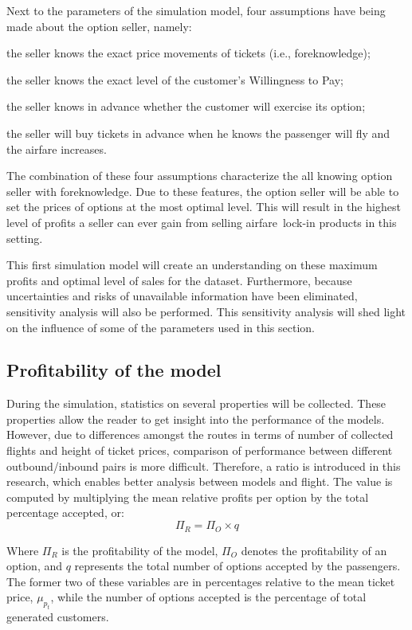 Next to the parameters of the simulation model, four assumptions have being made about the option seller, namely:
\begin{compactenum}
\item the seller knows the exact price movements of tickets (i.e., foreknowledge);
\item the seller knows the exact level of the customer's Willingness to Pay;
\item the seller knows in advance whether the customer will exercise its option;
\item the seller will buy tickets in advance when he knows the passenger will fly and the airfare increases.
\end{compactenum}

\vspace{1em}

The combination of these four assumptions characterize the all knowing option seller with foreknowledge. Due to these features, the option seller will be able to set the prices of options at the most optimal level. This will result in the highest level of profits a seller can ever gain from selling airfare~lock-in products in this setting.

This first simulation model will create an understanding on these maximum profits and optimal level of sales for the dataset. Furthermore, because uncertainties and risks of unavailable information have been eliminated, sensitivity analysis will also be performed. This sensitivity analysis will shed light on the influence of some of the parameters used in this section.


\subsection{Profitability of the model}
\label{subsec:ProfitabilityOfModel}
During the simulation, statistics on several properties will be collected. These properties allow the reader to get insight into the performance of the models. However, due to differences amongst the routes in terms of number of collected flights and height of ticket prices, comparison of performance between different outbound/inbound pairs is more difficult. Therefore, a ratio is introduced in this research, which enables better analysis between models and flight. The value is computed by multiplying the mean relative profits per option by the total percentage accepted, or:
$$\Pi_R = \Pi_O \times q$$

Where $\Pi_R$ is the profitability of the model, $\Pi_O$ denotes the profitability of an option, and $q$ represents the total number of options accepted by the passengers. The former two of these variables are in percentages relative to the mean ticket price, $\mu_{p_t}$, while the number of options accepted is the percentage of total generated customers.


